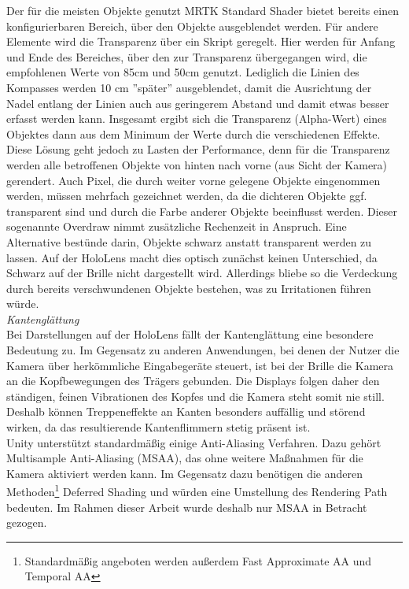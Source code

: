 Der für die meisten Objekte genutzt MRTK Standard Shader bietet bereits einen konfigurierbaren Bereich, über den Objekte ausgeblendet werden. Für andere Elemente wird die Transparenz über ein Skript geregelt. Hier werden für Anfang und Ende des Bereiches, über den zur Transparenz übergegangen wird, die empfohlenen Werte von 85cm und 50cm genutzt. Lediglich die Linien des Kompasses werden 10 cm ''später'' ausgeblendet, damit die Ausrichtung der Nadel entlang der Linien auch aus geringerem Abstand und damit etwas besser erfasst werden kann. Insgesamt ergibt sich die Transparenz (Alpha-Wert) eines Objektes dann aus dem Minimum der Werte durch die verschiedenen Effekte.\\

Diese Lösung geht jedoch zu Lasten der Performance, denn für die Transparenz werden alle betroffenen Objekte von hinten nach vorne (aus Sicht der Kamera) gerendert. Auch Pixel, die durch weiter vorne gelegene Objekte eingenommen werden, müssen mehrfach gezeichnet werden, da die dichteren Objekte ggf. transparent sind und durch die Farbe anderer Objekte beeinflusst werden. Dieser sogenannte Overdraw nimmt zusätzliche Rechenzeit in Anspruch. Eine Alternative bestünde darin, Objekte schwarz anstatt transparent werden zu lassen. Auf der HoloLens macht dies optisch zunächst keinen Unterschied, da Schwarz auf der Brille nicht dargestellt wird. Allerdings bliebe so die Verdeckung durch bereits verschwundenen Objekte bestehen, was zu Irritationen führen würde.\\

\textit{Kantenglättung}\\
Bei Darstellungen auf der HoloLens fällt der Kantenglättung eine besondere Bedeutung zu. Im Gegensatz zu anderen Anwendungen, bei denen der Nutzer die Kamera über herkömmliche Eingabegeräte steuert, ist bei der Brille die Kamera an die Kopfbewegungen des Trägers gebunden. Die Displays folgen daher den ständigen, feinen Vibrationen des Kopfes und die Kamera steht somit nie still. Deshalb können Treppeneffekte an Kanten besonders auffällig und störend wirken, da das resultierende Kantenflimmern stetig präsent ist.\\

Unity unterstützt standardmäßig einige Anti-Aliasing Verfahren. Dazu gehört Multisample Anti-Aliasing (MSAA), das ohne weitere Maßnahmen für die Kamera aktiviert werden kann. Im Gegensatz dazu benötigen die anderen Methoden\footnote{Standardmäßig angeboten werden außerdem Fast Approximate AA und Temporal AA} Deferred Shading und würden eine Umstellung des Rendering Path bedeuten. Im Rahmen dieser Arbeit wurde deshalb nur MSAA in Betracht gezogen.\\


